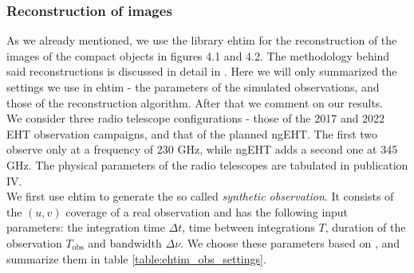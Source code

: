 \documentclass[12pt]{article}
\numberwithin{equation}{section}
\numberwithin{figure}{section}
\begin{document}
	\subsubsection{Reconstruction of images}
	
	As we already mentioned, we use the library ehtim for the reconstruction of the images of the compact objects in figures 4.1 and 4.2. The methodology behind said reconstructions is discussed in detail in \cite{EHTIM}. Here we will only summarized the settings we use in ehtim - the parameters of the simulated observations, and those of the reconstruction algorithm. After that we comment on our results.\\ 
	
	We consider three radio telescope configurations - those of the 2017 and 2022 EHT observation campaigns, and that of the planned ngEHT. The first two observe only at a frequency of 230 GHz, while ngEHT adds a second one at 345 GHz. The physical parameters of the radio telescopes are tabulated in publication IV.\\
	
	We first use ehtim to generate the so called \emph{synthetic observation}. It consists of the $(u,v)$ coverage of a real observation and has the following input parameters: the integration time $\Delta t$, time between integrations $T$, duration of the observation $T_\text{obs}$ and bandwidth $\Delta\nu$. We choose these parameters based on \cite{EHTIM}, and summarize them in table \ref{table:ehtim_obs_settings}.\\ 
	
\end{document}
